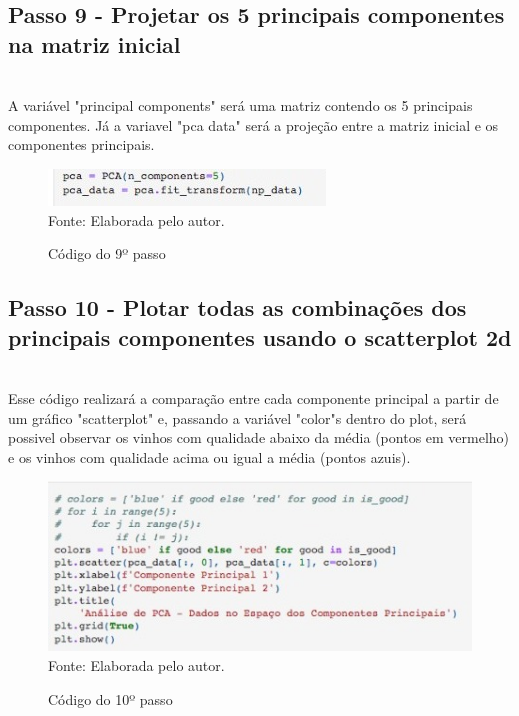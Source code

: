 \documentclass[a4paper, 12pt]{article}
\begin{document}
\subsection{Passo 9 - Projetar os 5 principais componentes na matriz inicial}

\\A variável "principal components" será uma matriz contendo os 5 principais componentes. Já a variavel "pca data" será a projeção entre a matriz inicial e os componentes principais.

 \begin{figure}[!ht]
        \centering
        \caption{Código do 9º passo}
        \includegraphics[scale=0.5]{passo9.jpg} \\
        {\footnotesize Fonte: Elaborada pelo autor.}
        \label{fig:my_label}
    \end{figure}
    
\newpage

\subsection{Passo 10 - Plotar todas as combinações dos principais componentes usando o scatterplot 2d}
\\Esse código realizará a comparação entre cada componente principal a partir de um gráfico "scatterplot" e, passando a variável "color"s dentro do plot, será possivel observar os vinhos com qualidade abaixo da média (pontos em vermelho) e os vinhos com qualidade acima ou igual a média (pontos azuis).

 \begin{figure}[!ht]
        \centering
        \caption{Código do 10º passo}
        \includegraphics[scale=0.5]{passo10.jpg} \\
        {\footnotesize Fonte: Elaborada pelo autor.}
        \label{fig:my_label}
    \end{figure}
    
\end{document}
